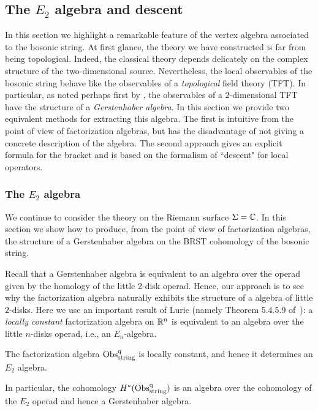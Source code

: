 \subsection{The $E_2$ algebra and descent}

In this section we highlight a remarkable feature of the vertex algebra associated to the bosonic string. 
At first glance, the theory we have constructed is far from being topological.
Indeed, the classical theory depends delicately on the complex structure of the two-dimensional source. 
Nevertheless, the local observables of the bosonic string behave like the observables of a {\em topological} field theory (TFT). 
In particular, as noted perhaps first by \cite{Getzler}, the observables of a 2-dimensional TFT have the structure of a {\em Gerstenhaber algebra}.
In this section we provide two equivalent methods for extracting this algebra.
The first is intuitive from the point of view of factorization algebras, but has the disadvantage of not giving a concrete description of the algebra. 
The second approach gives an explicit formula for the bracket and is based on the formalism of ``descent" for local operators. 

\subsubsection{The $E_2$ algebra}

We continue to consider the theory on the Riemann surface $\Sigma = \mathbb C$. 
In this section we show how to produce, from the point of view of factorization algebras, the structure of a Gerstenhaber algebra on the BRST cohomology of the bosonic string. 

Recall that a Gerstenhaber algebra is equivalent to an algebra over the operad given by the homology of the little 2-disk operad.
Hence, our approach is to see why the factorization algebra naturally exhibits the structure of a algebra of little 2-disks.
Here we use an important result of Lurie (namely Theorem 5.4.5.9 of~\cite{Lurie}): 
a {\em locally constant} factorization algebra on $\mathbb R^n$ is equivalent to an algebra over the little $n$-disks operad, i.e., an $E_n$-algebra. 

\begin{prop} 
\label{prop: obs is e2}
The factorization algebra ${\rm Obs}^{\rm q}_{\rm string}$ is locally constant, 
and hence it determines an $E_2$ algebra.
\end{prop}

In particular, the cohomology $H^*({\rm Obs}^{\rm q}_{\rm string})$ is an algebra over the cohomology of the $E_2$ operad and hence a Gerstenhaber algebra.

